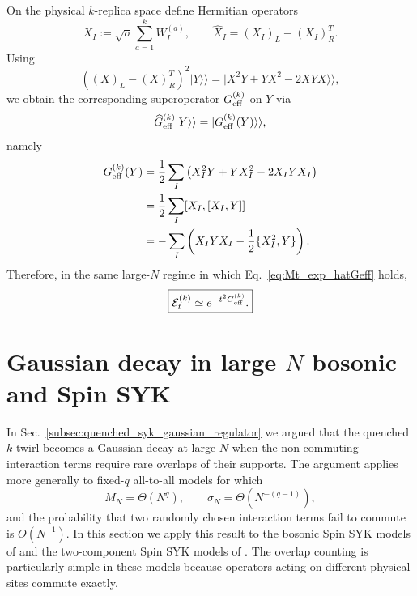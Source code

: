 \documentclass{article}
\theoremstyle{definition}
\begin{document}
On the physical $k$-replica space define Hermitian operators
\begin{equation}
    X_I
    :=
    \sqrt{\sigma}
    \sum_{a=1}^kW_I^{(a)},
    \qquad
    \widehat X_I
    =
    (X_I)_L-(X_I)_R^T.
\end{equation}
Using
\begin{equation}
    \left((X)_L-(X)_R^T\right)^2|Y\rangle\rangle
    =
    |X^2Y+YX^2-2XYX\rangle\rangle,
\end{equation}
we obtain the corresponding superoperator $G_{\rm eff}^{(k)}$ on $Y$ via
\begin{equation}
    \widehat G_{\rm eff}^{(k)}|Y\rangle\rangle
    =
    |G_{\rm eff}^{(k)}(Y)\rangle\rangle,
\end{equation}
namely
\begin{align}
    G_{\rm eff}^{(k)}(Y)
    &=
    \frac12\sum_I
    \left(
       X_I^2Y+YX_I^2-2X_IYX_I
    \right)
    \nonumber\\
    &=
    \frac12\sum_I[X_I,[X_I,Y]]
    \nonumber\\
    &=
    -\sum_I
    \left(
       X_IYX_I
       -
       \frac12\{X_I^2,Y\}
    \right).
    \label{eq:Geff_quenched}
\end{align}
Therefore, in the same large-$N$ regime in which
Eq.~\eqref{eq:Mt_exp_hatGeff} holds,
\begin{equation}
    \boxed{
    {\cal E}_t^{(k)}
    \simeq
    e^{-t^2G_{\rm eff}^{(k)}}.
    }
    \label{eq:quenched_channel_final}
\end{equation}
\section{Gaussian decay in large $N$ bosonic and Spin SYK}
\label{sec:bosonic_spin_syk_gaussian_regulator}

In Sec.~\ref{subsec:quenched_syk_gaussian_regulator} we argued that the
quenched $k$-twirl becomes a Gaussian decay at large $N$ when the
non-commuting interaction terms require rare overlaps of their supports.
The argument applies more generally to fixed-$q$ all-to-all models for
which
\begin{equation}
    M_N=\Theta(N^q),
    \qquad
    \sigma_N=\Theta(N^{-(q-1)}),
\end{equation}
and the probability that two randomly chosen interaction terms fail to
commute is $O(N^{-1})$.  In this section we apply this result to the
bosonic Spin SYK models of \cite{SwingleWiner} and the two-component
Spin SYK models of \cite{BasuDasNandy}.  The overlap counting is
particularly simple in these models because operators acting on different
physical sites commute exactly.
\end{document}
